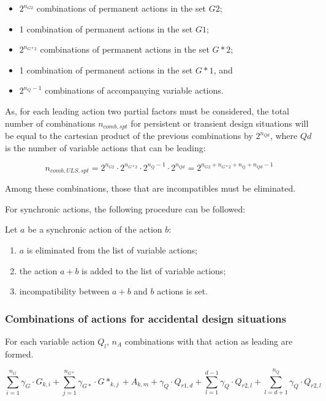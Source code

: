 \begin{itemize}
\item $2^{n_{G2}}$ combinations of permanent actions in the set $G2$;
\item 1 combination of permanent actions in the set $G1$;
\item $2^{n_{G*2}}$ combinations of permanent actions in the set $G*2$;
\item 1 combination of permanent actions in the set $G*1$, and
\item $2^{n_{Q}-1}$ combinations of accompanying variable actions.
\end{itemize}

As, for each leading action two partial factors must be considered, the total number of combinations $n_{comb,spt}$ for persistent or transient design situations will be equal to the cartesian product of the previous combinations by  $2^{n_{Qd}}$, where $Qd$ is the number of variable actions that can be leading:

\begin{equation} \label{eq_ncomb_spt}
n_{comb,ULS,spt}= 2^{n_{G2}} \cdot 2^{n_{G*2}} \cdot 2^{n_{Q}-1} \cdot 2^{n_{Qd}}= 2^{n_{G2}+n_{G*2}+n_{Q}+n_{Qd}-1}
\end{equation}

Among these combinations, those that are incompatibles must be eliminated. 


For synchronic actions, the following procedure can be followed:

Let $a$ be a synchronic action of the action $b$:

\begin{enumerate}
\item $a$ is eliminated from the list of variable actions;
\item the action $a+b$ is added to the list of variable actions;
\item incompatibility between $a+b$ and $b$ actions is set.
\end{enumerate} 


\subsubsection{Combinations of actions for accidental design situations}
For each variable action $Q_l$, $n_A$ combinations with that action as leading are formed.

\begin{equation}\label{eq_comb_acc}
\sum_{i=1}^{n_G} \gamma_G \cdot G_{k,i} +\sum_{j=1}^{n_{G*}} \gamma_{G*} \cdot G*_{k,j} + A_{k,m} + \gamma_Q \cdot Q_{r1,d} + \sum_{l=1}^{d-1} \gamma_Q \cdot Q_{r2,l} + \sum_{l=d+1}^{n_Q} \gamma_Q \cdot Q_{r2,l} 
\end{equation}

